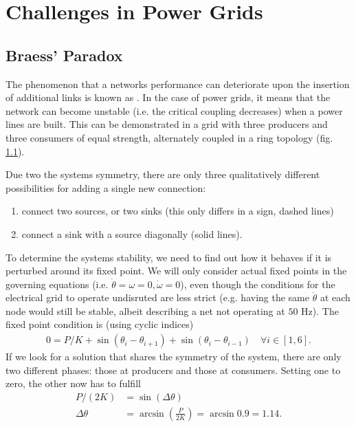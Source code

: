 \documentclass{scrartcl}
\begin{document}
\clearpage

\section{Challenges in Power Grids}
\subsection{Braess' Paradox}
The phenomenon that a networks performance can deteriorate upon the insertion of additional links is known as . In the case of power grids, it means that the network can become unstable (i.e. the critical coupling decreases) when a power lines are built. This can be demonstrated in a grid with three producers and three consumers of equal strength, alternately coupled in a ring topology (fig. \ref{}). 



Due two the systems symmetry, there are only three qualitatively different possibilities for adding a single new connection:
\begin{enumerate}
 \item connect two sources, or two sinks (this only differs in a sign, dashed lines)
 \item connect a sink with a source diagonally (solid lines).
\end{enumerate}

To determine the systems stability, we need to find out how it behaves if it is perturbed around its fixed point. We will only consider actual fixed points in the governing equations (i.e. $\dot{\theta} = \omega = 0, \dot{\omega} = 0$), even though the conditions for the electrical grid to operate undisruted are less strict (e.g. having the same $\dot{\theta}$ at each node would still be stable, albeit describing a net not operating at $50$ Hz).
The fixed point condition is (using cyclic indices)
\begin{align}
 0 = P/K + \sin \left(\theta_i - \theta_{i+1} \right) + \sin \left(\theta_i - \theta_{i-1} \right) \quad \forall i \in \left[ 1, 6\right].
\end{align}
If we look for a solution that shares the symmetry of the system, there are only two different phases: those at producers and those at consumers. Setting one to zero, the other now has to fulfill
\begin{align}
P/(2K) &= \sin \left( \Delta \theta \right)\\
\Delta \theta &= \arcsin \left( \frac{P}{2K}\right) = \arcsin{0.9} = 1.14.
\end{align}
 
\end{document}
